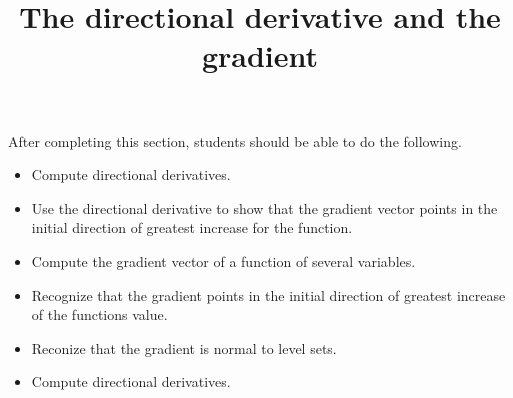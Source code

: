 \documentclass{ximera}
\title{The directional derivative and the gradient}
\begin{document}
\begin{abstract}
\end{abstract}

\maketitle

\begin{sectionOutcomes}

After completing this section, students should be able to do the following.

\begin{itemize}
\item Compute directional derivatives.
\item Use the directional derivative to show that the gradient vector points in the initial direction of greatest increase for the function. 
\item Compute the gradient vector of a function of several variables.
\item Recognize that the gradient points in the initial direction of
greatest increase of the functions value.
\item Reconize that the gradient is normal to level sets.
\item Compute directional derivatives.
\end{itemize}

\end{sectionOutcomes}
\end{document}
